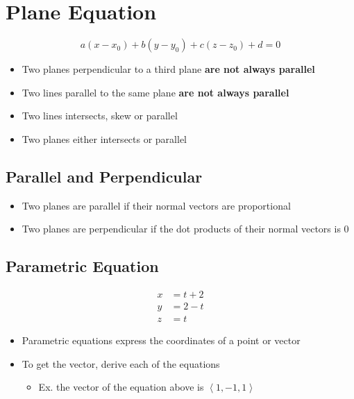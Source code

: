 \section{Plane Equation}

  \begin{equation}
    a\left( x - x_{0} \right) + b\left( y - y_{0} \right) + c\left( z - z_{0} \right) + d = 0
  \end{equation}

  \begin{itemize}
    \item Two planes perpendicular to a third plane \textbf{are not always parallel}
    \item Two lines parallel to the same plane \textbf{are not always parallel}
    \item Two lines intersects, skew or parallel
    \item Two planes either intersects or parallel
  \end{itemize}

  \subsection{Parallel and Perpendicular}

    \begin{itemize}
      \item Two planes are parallel if their normal vectors are proportional
      \item Two planes are perpendicular if the dot products of their normal
      vectors is $ 0 $
    \end{itemize}

  \subsection{Parametric Equation}

    \begin{align*}
      x &= t + 2 \\
      y &= 2 - t \\
      z &= t
    \end{align*}

    \begin{itemize}
      \item Parametric equations express the coordinates of a point or vector
      \item To get the vector, derive each of the equations
      \begin{itemize}
        \item Ex. the vector of the equation above is $ \left< 1, -1, 1 \right> $
      \end{itemize}
    \end{itemize}


